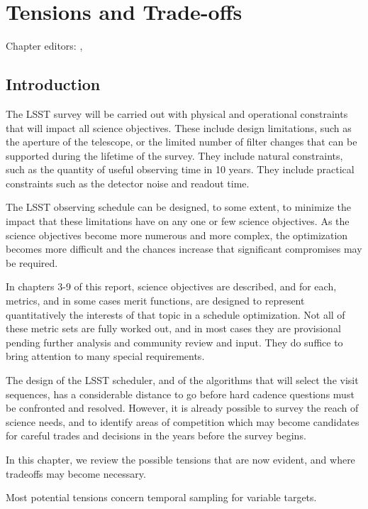 \chapter[Tensions and Trade-offs]{Tensions and Trade-offs}
\def\chpname{tradeoffs}\label{chp:\chpname}

Chapter editors:
,



\section{Introduction}
	
The LSST survey will be carried out with physical and operational constraints that will impact all science objectives.  These include design limitations, such as the aperture of the telescope, or the limited number of filter changes that can be supported during the lifetime of the survey.  They include natural constraints, such as the quantity of useful observing time in 10 years. They include practical constraints such as the detector noise and readout time.

The LSST observing schedule can be designed, to some extent, to minimize the impact that these limitations have on any one or few science objectives. As the science objectives become more numerous and more complex, the optimization becomes more difficult and the chances increase that significant compromises may be required.

In chapters 3-9 of this report, science objectives are described, and for each, metrics, and in some cases merit functions, are designed to represent quantitatively the interests of that topic in a schedule optimization.  Not all of these metric sets are fully worked out, and in most cases they are provisional pending further analysis and community review and input.  They do suffice to bring attention to many special requirements.

The design of the LSST scheduler, and of the algorithms that will select the visit sequences, has a considerable distance to go before hard cadence questions must be confronted and resolved.  However, it is already possible to survey the reach of science needs, and to identify areas of competition which may become candidates for careful trades and decisions in the years before the survey begins.

In this chapter, we review the possible tensions that are now evident, and where tradeoffs may become necessary.

Most potential tensions concern temporal sampling for variable targets.

